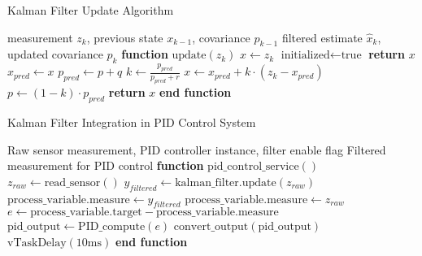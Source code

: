 


\begin{algorithm}
\caption{Kalman Filter Update Algorithm}
\label{alg:kalman_update}
\begin{algorithmic}[1]
\REQUIRE measurement $z_k$, previous state $x_{k-1}$, covariance $p_{k-1}$
\ENSURE filtered estimate $\hat{x}_k$, updated covariance $p_k$
\STATE \textbf{function} $\text{update}(z_k)$
    \STATE $x \leftarrow z_k$ 
    \STATE $\text{initialized} \leftarrow \text{true}$
    \STATE \textbf{return} $x$
\ENDIF
\STATE
\STATE {}
\STATE $x_{pred} \leftarrow x$ 
\STATE $p_{pred} \leftarrow p + q$ 
\STATE
{}
\STATE
\STATE {}
\STATE $k \leftarrow \frac{p_{pred}}{p_{pred} + r}$ 
\STATE $x \leftarrow x_{pred} + k \cdot (z_k - x_{pred})$ 
\STATE $p \leftarrow (1 - k) \cdot p_{pred}$ 
\STATE
\STATE \textbf{return} $x$
\STATE \textbf{end function}
\end{algorithmic}
\end{algorithm}

\begin{algorithm}
\caption{Kalman Filter Integration in PID Control System}
\label{alg:kalman_pid_integration}
\begin{algorithmic}[1]
\REQUIRE Raw sensor measurement, PID controller instance, filter enable flag
\ENSURE Filtered measurement for PID control
\STATE \textbf{function} $\text{pid\_control\_service}()$
    \STATE $z_{raw} \leftarrow \text{read\_sensor}()$ 
        \STATE $y_{filtered} \leftarrow \text{kalman\_filter.update}(z_{raw})$
        \STATE $\text{process\_variable.measure} \leftarrow y_{filtered}$
    \ELSE
        \STATE $\text{process\_variable.measure} \leftarrow z_{raw}$
    \ENDIF
    \STATE
    \STATE $e \leftarrow \text{process\_variable.target} - \text{process\_variable.measure}$
    \STATE $\text{pid\_output} \leftarrow \text{PID\_compute}(e)$
    \STATE $\text{convert\_output}(\text{pid\_output})$ 
    \STATE $\text{vTaskDelay}(10\text{ms})$ 
\ENDWHILE
\STATE \textbf{end function}
\end{algorithmic}
\end{algorithm}